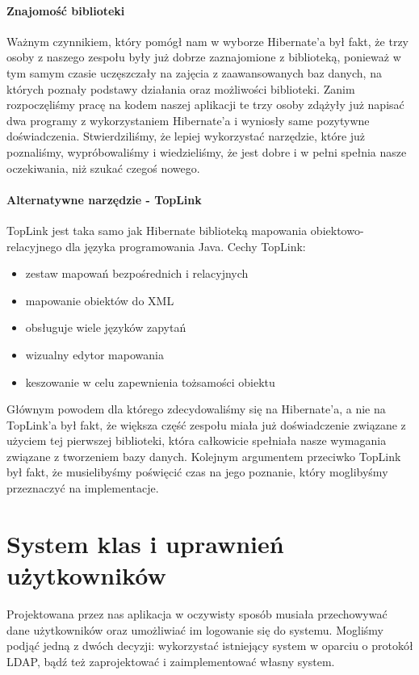 \documentclass[licencjacka]{pracamgr}
\begin{document}
\paragraph{Znajomość biblioteki} 
Ważnym czynnikiem, który pomógł nam w wyborze Hibernate'a był fakt, że trzy osoby z naszego zespołu 
były już dobrze zaznajomione z biblioteką, ponieważ w tym samym czasie uczęszczały na zajęcia z zaawansowanych baz danych, na których 
poznały podstawy działania oraz możliwości biblioteki. Zanim rozpoczęliśmy pracę na kodem naszej aplikacji te trzy osoby zdążyły już 
napisać dwa programy z wykorzystaniem Hibernate'a i wyniosły same pozytywne doświadczenia. Stwierdziliśmy, że lepiej wykorzystać narzędzie, 
które już poznaliśmy, wypróbowaliśmy i wiedzieliśmy, że jest dobre i w pełni spełnia nasze oczekiwania, niż szukać czegoś nowego.

\paragraph{Alternatywne narzędzie - TopLink}
TopLink jest taka samo jak Hibernate biblioteką mapowania obiektowo-relacyjnego dla języka programowania Java. Cechy TopLink:
\begin{itemize}
\item zestaw mapowań bezpośrednich i relacyjnych
\item mapowanie obiektów do XML
\item obsługuje wiele języków zapytań
\item wizualny edytor mapowania
\item keszowanie w celu zapewnienia tożsamości obiektu
\end{itemize}
Głównym powodem dla którego zdecydowaliśmy się na Hibernate'a, a nie na TopLink'a był fakt, że większa część zespołu miała już 
doświadczenie związane z użyciem tej pierwszej biblioteki, która całkowicie spełniała nasze wymagania związane z tworzeniem bazy 
danych. Kolejnym argumentem przeciwko TopLink był fakt, że musielibyśmy poświęcić czas na jego poznanie, który moglibyśmy 
przeznaczyć na implementacje.

\section{System klas i uprawnień użytkowników}
Projektowana przez nas aplikacja w oczywisty sposób musiała przechowywać dane użytkowników oraz umożliwiać im logowanie się do systemu. Mogliśmy podjąć jedną z dwóch decyzji: wykorzystać istniejący system w oparciu o protokół LDAP, bądź też zaprojektować i zaimplementować własny system.
\end{document}
